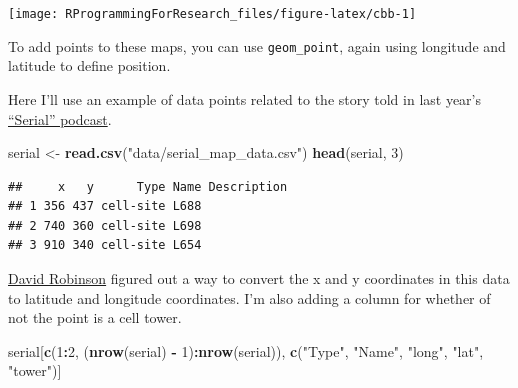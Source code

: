 \documentclass[]{book}
\makeatletter
\newenvironment{Shaded}{\begin{snugshade}}{\end{snugshade}}
\newcommand{\KeywordTok}[1]{\textcolor[rgb]{0.13,0.29,0.53}{\textbf{#1}}}
\newcommand{\DataTypeTok}[1]{\textcolor[rgb]{0.13,0.29,0.53}{#1}}
\newcommand{\DecValTok}[1]{\textcolor[rgb]{0.00,0.00,0.81}{#1}}
\newcommand{\FloatTok}[1]{\textcolor[rgb]{0.00,0.00,0.81}{#1}}
\newcommand{\StringTok}[1]{\textcolor[rgb]{0.31,0.60,0.02}{#1}}
\newcommand{\OperatorTok}[1]{\textcolor[rgb]{0.81,0.36,0.00}{\textbf{#1}}}
\newcommand{\NormalTok}[1]{#1}
\newenvironment{kframe}{%
\medskip{}
\setlength{\fboxsep}{.8em}
 \def\at@end@of@kframe{}%
 \ifinner\ifhmode%
  \def\at@end@of@kframe{\end{minipage}}%
  \begin{minipage}{\columnwidth}%
 \fi\fi%
 \def\FrameCommand##1{\hskip\@totalleftmargin \hskip-\fboxsep
 \colorbox{shadecolor}{##1}\hskip-\fboxsep
     \hskip-\linewidth \hskip-\@totalleftmargin \hskip\columnwidth}%
 \MakeFramed {\advance\hsize-\width
   \@totalleftmargin\z@ \linewidth\hsize
   \@setminipage}}%
 {\par\unskip\endMakeFramed%
 \at@end@of@kframe}
\renewenvironment{Shaded}{\begin{kframe}}{\end{kframe}}
\theoremstyle{definition}
\theoremstyle{definition}
\theoremstyle{definition}
\theoremstyle{remark}
\makeatother
\begin{document}
\begin{center}\texttt{[image: RProgrammingForResearch\_files/figure-latex/cbb-1]} \end{center}

To add points to these maps, you can use \texttt{geom\_point}, again
using longitude and latitude to define position. \bigskip

Here I'll use an example of data points related to the story told in
last year's \href{http://serialpodcast.org}{``Serial'' podcast}.

\begin{Shaded}
\begin{Highlighting}[]
\NormalTok{serial <-}\StringTok{ }\KeywordTok{read.csv}\NormalTok{(}\StringTok{"data/serial_map_data.csv"}\NormalTok{)}
\KeywordTok{head}\NormalTok{(serial, }\DecValTok{3}\NormalTok{)}
\end{Highlighting}
\end{Shaded}

\begin{verbatim}
##     x   y      Type Name Description
## 1 356 437 cell-site L688            
## 2 740 360 cell-site L698            
## 3 910 340 cell-site L654
\end{verbatim}

\href{https://github.com/dgrtwo/serial-ggvis/blob/master/serial-preprocessing.Rmd}{David
Robinson} figured out a way to convert the x and y coordinates in this
data to latitude and longitude coordinates. I'm also adding a column for
whether of not the point is a cell tower.

\begin{Shaded}
\end{Shaded}

\begin{Shaded}
\begin{Highlighting}[]
\NormalTok{serial[}\KeywordTok{c}\NormalTok{(}\DecValTok{1}\OperatorTok{:}\DecValTok{2}\NormalTok{, (}\KeywordTok{nrow}\NormalTok{(serial) }\OperatorTok{-}\StringTok{ }\DecValTok{1}\NormalTok{)}\OperatorTok{:}\KeywordTok{nrow}\NormalTok{(serial)), }
       \KeywordTok{c}\NormalTok{(}\StringTok{"Type"}\NormalTok{, }\StringTok{"Name"}\NormalTok{, }\StringTok{"long"}\NormalTok{, }\StringTok{"lat"}\NormalTok{, }\StringTok{"tower"}\NormalTok{)]}
\end{Highlighting}
\end{Shaded}
\end{document}
